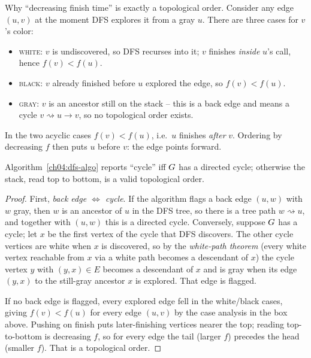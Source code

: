 \begin{whybox}
Why ``decreasing finish time'' is exactly a topological order. Consider any edge $(u,v)$ at the
moment DFS explores it from a gray $u$. There are three cases for $v$'s color:
\begin{itemize}
\item \textsc{white}: $v$ is undiscovered, so DFS recurses into it; $v$ finishes \emph{inside} $u$'s
call, hence $f(v)<f(u)$.
\item \textsc{black}: $v$ already finished before $u$ explored the edge, so $f(v)<f(u)$.
\item \textsc{gray}: $v$ is an ancestor still on the stack -- this is a back edge and means a cycle
$v\rightsquigarrow u\to v$, so no topological order exists.
\end{itemize}
In the two acyclic cases $f(v)<f(u)$, i.e.\ $u$ finishes \emph{after} $v$. Ordering by decreasing
$f$ then puts $u$ before $v$: the edge points forward.
\end{whybox}

\begin{theorem}\label{ch04:dfs-correct}
Algorithm~\ref{ch04:dfs-algo} reports ``cycle'' iff $G$ has a directed cycle; otherwise the stack,
read top to bottom, is a valid topological order.
\end{theorem}

\begin{proof}
First, \emph{back edge $\Leftrightarrow$ cycle}. If the algorithm flags a back edge $(u,w)$ with $w$
gray, then $w$ is an ancestor of $u$ in the DFS tree, so there is a tree path $w\rightsquigarrow u$,
and together with $(u,w)$ this is a directed cycle. Conversely, suppose $G$ has a cycle; let $x$
be the first vertex of the cycle that DFS discovers. The other cycle vertices are white when $x$ is
discovered, so by the \emph{white-path theorem} (every white vertex reachable from $x$ via a white
path becomes a descendant of $x$) the cycle vertex $y$ with $(y,x)\in E$ becomes a descendant of $x$
and is gray when its edge $(y,x)$ to the still-gray ancestor $x$ is explored. That edge is flagged.

If no back edge is flagged, every explored edge fell in the white/black cases, giving $f(v)<f(u)$ for
every edge $(u,v)$ by the case analysis in the box above. Pushing on finish puts later-finishing
vertices nearer the top; reading top-to-bottom is decreasing $f$, so for every edge the tail (larger
$f$) precedes the head (smaller $f$). That is a topological order.
\end{proof}

